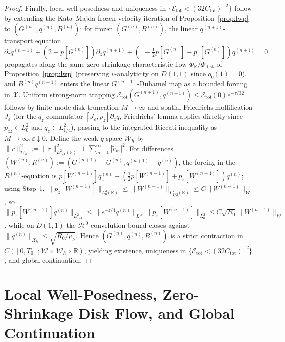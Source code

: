 \documentclass[11pt,a4paper]{article}
\begin{document}
\begin{proof}
Finally, local well-posedness and uniqueness in $\{\mathcal{E}_{\mathrm{tot}} < (32 C_{\mathrm{tot}})^{-2}\}$
follow by extending the Kato--Majda frozen-velocity iteration of Proposition~\ref{prop:lwp} to $(G^{(n)}, q^{(n)}, B^{(n)})$:
for frozen $(G^{(n)}, B^{(n)})$, the linear $q^{(n+1)}$-transport equation
$\partial_\tau q^{(n+1)} + (2-p[G^{(n)}])\partial_z q^{(n+1)} + (1-\tfrac12 p[G^{(n)}]-p_z[G^{(n)}])q^{(n+1)} = 0$
propagates along the same zero-shrinkage characteristic flow $\Phi_{\mathbb{R}}/\Phi_{\mathrm{disk}}$ of
Proposition~\ref{prop:lwp} (preserving $v$-analyticity on $D(1,1)$ since $q_0(1)=0$), and $B^{(n)} q^{(n+1)}$
enters the linear $G^{(n+1)}$-Duhamel map as a bounded forcing in $\mathcal{X}$.
Uniform strong-norm trapping $\mathcal{E}_{\mathrm{tot}}(G^{(n+1)}, q^{(n+1)}) \le \mathcal{E}_{\mathrm{tot}}(0)e^{-\tau/32}$
follows by finite-mode disk truncation $M\to\infty$ and spatial Friedrichs mollification $J_\varepsilon$
(for the $q_z$ commutator $[J_\varepsilon, p_z]\partial_z q$, Friedrichs' lemma applies directly since
$p_{zz}\in L^2_0$ and $q_z\in L^2_{1/4}$), passing to the integrated Riccati inequality as $M\to\infty, \varepsilon\downarrow 0$.
Define the weak $q$-space $\mathcal{W}_h$ by
$\|r\|_{\mathcal{W}_h}^2 := \|r\|_{L^2_{1/4}(\mathbb{R})}^2 + \sum_{m=1}^\infty |\tilde{r}_m|^2$.
For differences $(W^{(n)}, R^{(n)}) := (G^{(n+1)}-G^{(n)}, q^{(n+1)}-q^{(n)})$, the forcing in the $R^{(n)}$-equation
is $p[W^{(n-1)}]q_z^{(n)} + (\tfrac12 p[W^{(n-1)}] + p_z[W^{(n-1)}])q^{(n)}$; using Step~1,
$\|p_z[W^{(n-1)}]\|_{L^2_0(\mathbb{R})} \le \|W^{(n-1)}\|_{L^2_{1/2}(\mathbb{R})} \le C\|W^{(n-1)}\|_{\mathcal{W}}$,
so $\|p_z[W^{(n-1)}] q^{(n)}\|_{L^2_{1/4}} \le \|e^{-z/4} q^{(n)}\|_{L^\infty}\|p_z[W^{(n-1)}]\|_{L^2_0} \le C\sqrt{R_0}\|W^{(n-1)}\|_{\mathcal{W}}$,
while on $D(1,1)$ the $\mathcal{H}^0$ convolution bound closes against $\|q^{(n)}\|_{\mathcal{X}_h}\le\sqrt{R_0/\mu_h}$.
Hence $(G^{(n)}, q^{(n)}, B^{(n)})$ is a strict contraction in $C([0,T_0];\mathcal{W}\times\mathcal{W}_h\times\mathbb{R})$,
yielding existence, uniqueness in $\{\mathcal{E}_{\mathrm{tot}} < (32 C_{\mathrm{tot}})^{-2}\}$, and global continuation.
\end{proof}

\section{Local Well-Posedness, Zero-Shrinkage Disk Flow, and Global Continuation}
\label{app:lwp}
\end{document}
